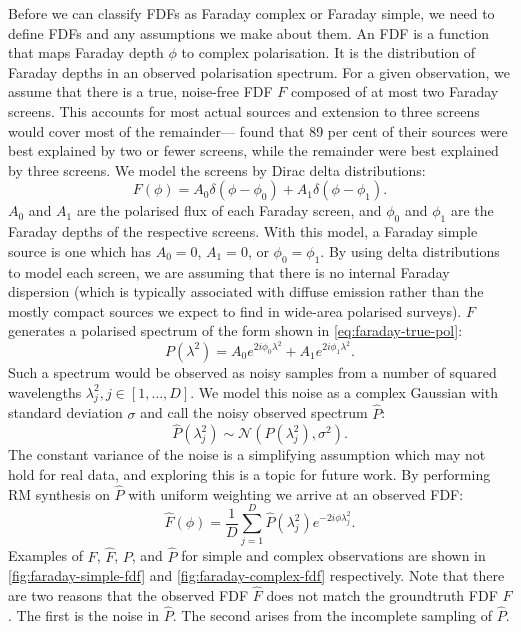     Before we can classify FDFs as Faraday complex or Faraday simple, we need to define FDFs and any assumptions we make about them. An FDF is a function that maps Faraday depth $\phi$ to complex polarisation. It is the distribution of Faraday depths in an observed polarisation spectrum. For a given observation, we assume that there is a true, noise-free FDF $F$ composed of at most two Faraday screens. This accounts for most actual sources \citep{anderson_broadband_2015} and extension to three screens would cover most of the remainder---\citet{osullivan_broad-band_2017} found that 89 per cent of their sources were best explained by two or fewer screens, while the remainder were best explained by three screens. We model the screens by Dirac delta distributions:
    \begin{equation}
        \label{eq:faraday-true-fdf}
        F(\phi) = A_0 \delta(\phi - \phi_0) + A_1 \delta(\phi - \phi_1).
    \end{equation}
    $A_0$ and $A_1$ are the polarised flux of each Faraday screen, and $\phi_0$ and $\phi_1$ are the Faraday depths of the respective screens. With this model, a Faraday simple source is one which has $A_0 = 0$, $A_1 = 0$, or $\phi_0 = \phi_1$. By using delta distributions to model each screen, we are assuming that there is no internal Faraday dispersion (which is typically associated with diffuse emission rather than the mostly compact sources we expect to find in wide-area polarised surveys). $F$ generates a polarised spectrum of the form shown in \autoref{eq:faraday-true-pol}:
    \begin{equation}
        \label{eq:faraday-true-pol}
        P(\lambda^2) = A_0 e^{2i\phi_0\lambda^2} + A_1 e^{2i\phi_1\lambda^2}.
    \end{equation}
    Such a spectrum would be observed as noisy samples from a number of squared wavelengths $\lambda^2_j, j \in [1, \dots, D]$. We model this noise as a complex Gaussian with standard deviation $\sigma$ and call the noisy observed spectrum $\hat P$:
    \begin{equation}
      \label{eq:faraday-noisy-pol}
      \hat P(\lambda_j^2) \sim \mathcal N(P(\lambda^2_j), \sigma^2).
    \end{equation}
    The constant variance of the noise is a simplifying assumption which may not hold for real data, and exploring this is a topic for future work. By performing RM synthesis \citep{brentjens_faraday_2005} on $\hat P$ with uniform weighting we arrive at an observed FDF:
    \begin{equation}
      \label{eq:faraday-rm-synthesis}
      \hat F(\phi) = \frac{1}{D} \sum_{j = 1}^D \hat P(\lambda^2_j) e^{-2i\phi\lambda^2_j}.
    \end{equation}
    Examples of $F$, $\hat F$, $P$, and $\hat P$ for simple and complex observations are shown in \autoref{fig:faraday-simple-fdf} and \autoref{fig:faraday-complex-fdf} respectively. Note that there are two reasons that the observed FDF $\hat F$ does not match the groundtruth FDF $F$. The first is the noise in $\hat P$. The second arises from the incomplete sampling of $\hat P$.

